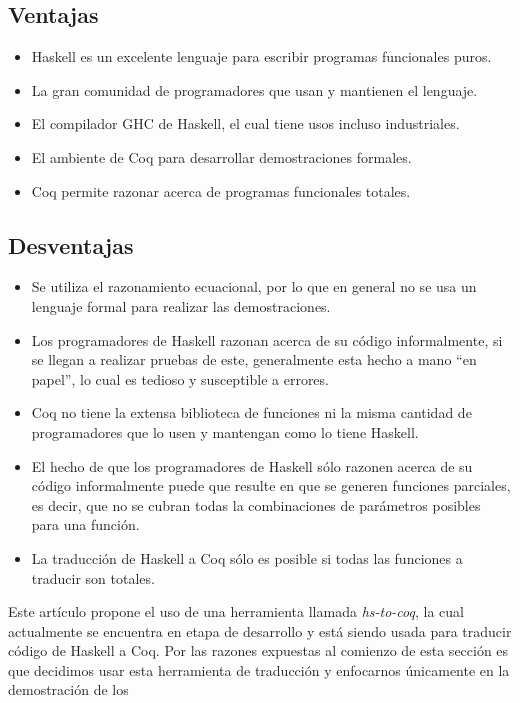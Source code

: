 \subsection{Ventajas}
\begin{itemize}
    \item Haskell es un excelente lenguaje para escribir programas funcionales puros.
    \item La gran comunidad de programadores que usan y mantienen el lenguaje.
    \item El compilador GHC de Haskell, el cual tiene usos incluso industriales.
    \item El ambiente de Coq para desarrollar demostraciones formales.
    \item Coq permite razonar acerca de programas funcionales totales.
\end{itemize}

\subsection{Desventajas}
\begin{itemize}
    \item Se utiliza el razonamiento ecuacional, por lo que en general no se usa un lenguaje formal para realizar las demostraciones.
    \item Los programadores de Haskell razonan acerca de su código informalmente, si se llegan a
    realizar pruebas de este, generalmente esta hecho a mano ``en papel'', lo cual es tedioso y
    susceptible a errores.
    \item Coq no tiene la extensa biblioteca de funciones ni la misma cantidad de programadores
    que lo usen y mantengan como lo tiene Haskell.
    \item El hecho de que los programadores de Haskell s\'olo razonen acerca de su código
    informalmente puede que resulte en que se generen funciones parciales, es decir, que no se
    cubran todas la combinaciones de parámetros posibles para una funci\'on.
    \item La traducci\'on de Haskell a Coq s\'olo es posible si todas las funciones a traducir son
    totales.
\end{itemize}

Este art\'iculo propone el uso de una herramienta llamada \textit{hs-to-coq}, la cual actualmente se
encuentra en etapa de desarrollo y est\'a siendo usada para traducir código de Haskell a Coq. Por las razones expuestas al comienzo de esta secci\'on es que decidimos usar esta herramienta de traducci\'on y enfocarnos \'unicamente en la demostraci\'on de los \arns

